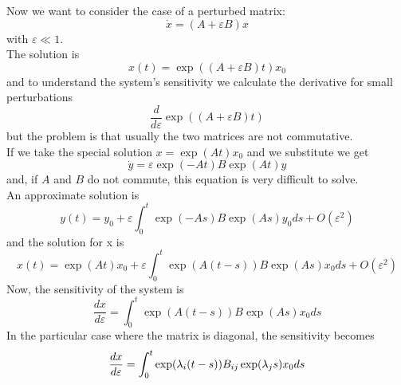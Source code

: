 Now we want to consider the case of a perturbed matrix:
$$
	\dot{x} = (A+\varepsilon B)x
$$
with $\varepsilon \ll 1$. \\
The solution is
$$
	x(t) = \exp((A+\varepsilon B) t)x_0
$$
and to understand the system's sensitivity we calculate the derivative for small perturbations
$$
	\frac{d}{d\varepsilon}\exp((A+\varepsilon B)t)
$$
but the problem is that usually the two matrices are not commutative. \\
If we take the special solution $x = \exp(At)x_0$ and we substitute we get
$$
	\dot{y} = \varepsilon\exp(-At)B\exp(At)y
$$
and, if $A$ and $B$ do not commute, this equation is very difficult to solve. \\
An approximate solution is
$$
	y(t) = y_0 + \varepsilon\int_0^t \exp(-As)B\exp(As)y_0ds + O(\varepsilon^2)
$$
and the solution for x is
\begin{equation}
	x(t) = \exp(At)x_0 + \varepsilon\int_0^t \exp(A(t-s))B\exp(As)x_0ds + O(\varepsilon^2)
\end{equation}
Now, the sensitivity of the system is
$$
	\frac{dx}{d\varepsilon} = \int_0^t \exp(A(t-s))B\exp(As)x_0ds 
$$
In the particular case where the matrix is diagonal, the sensitivity becomes
$$
	\frac{dx}{d\varepsilon} = \int_0^t \exp(\lambda_i(t-s))B_{ij}\exp(\lambda_js)x_0ds 
$$
